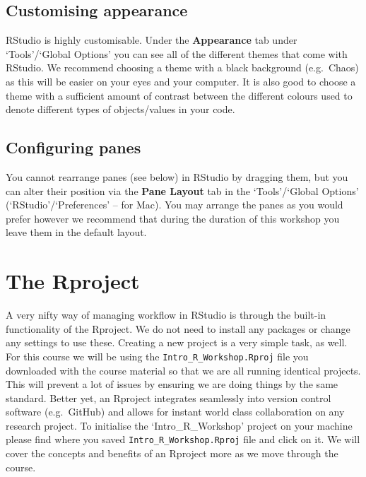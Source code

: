 \documentclass[
]{book}
\begin{document}
\hypertarget{customising-appearance}{%
\subsection{Customising appearance}\label{customising-appearance}}

RStudio is highly customisable. Under the \textbf{Appearance} tab under `Tools'/`Global Options' you can see all of the different themes that come with RStudio. We recommend choosing a theme with a black background (e.g.~Chaos) as this will be easier on your eyes and your computer. It is also good to choose a theme with a sufficient amount of contrast between the different colours used to denote different types of objects/values in your code.

\hypertarget{configuring-panes}{%
\subsection{Configuring panes}\label{configuring-panes}}

You cannot rearrange panes (see below) in RStudio by dragging them, but you can alter their position via the \textbf{Pane Layout} tab in the `Tools'/`Global Options' (`RStudio'/`Preferences' -- for Mac). You may arrange the panes as you would prefer however we recommend that during the duration of this workshop you leave them in the default layout.

\hypertarget{the-rproject}{%
\section{The Rproject}\label{the-rproject}}

A very nifty way of managing workflow in RStudio is through the built-in functionality of the Rproject. We do not need to install any packages or change any settings to use these. Creating a new project is a very simple task, as well. For this course we will be using the \texttt{Intro\_R\_Workshop.Rproj} file you downloaded with the course material so that we are all running identical projects. This will prevent a lot of issues by ensuring we are doing things by the same standard. Better yet, an Rproject integrates seamlessly into version control software (e.g.~GitHub) and allows for instant world class collaboration on any research project. To initialise the `Intro\_R\_Workshop' project on your machine please find where you saved \texttt{Intro\_R\_Workshop.Rproj} file and click on it. We will cover the concepts and benefits of an Rproject more as we move through the course.
\end{document}
